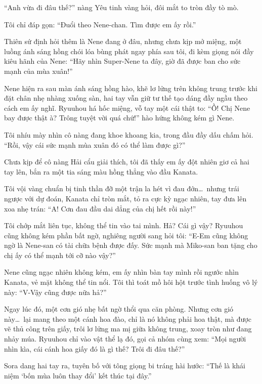 \documentclass[../main.tex]{subfiles}
\begin{document}
``Anh vừa đi đâu thế?'' nàng Yêu tinh vàng hỏi, đôi mắt to tròn đầy tò mò.

Tôi chỉ đáp gọn: ``Đuổi theo Nene-chan. Tìm được em ấy rồi.''

Thiên sứ định hỏi thêm là Nene đang ở đâu, nhưng chưa kịp mở miệng, một luồng ánh sáng hồng chói lóa bùng phát ngay phía sau tôi, đi kèm giọng nói đầy kiêu hãnh của Nene: ``Hãy nhìn Super-Nene ta đây, giờ đã được ban cho sức mạnh của mùa xuân!''

Nene hiện ra sau màn ánh sáng hồng hào, khẽ lơ lửng trên không trung trước khi đặt chân nhẹ nhàng xuống sàn, hai tay vẫn giữ tư thế tạo dáng đầy ngầu theo cách em ấy nghĩ. Ryuuhou há hốc miệng, vỗ tay một cái thật to: ``Ồ! Chị Nene bay được thật à? Trông tuyệt vời quá chứ!'' hào hứng không kém gì Nene.

Tôi nhíu mày nhìn cô nàng đang khoe khoang kia, trong đầu đầy dấu chấm hỏi. ``Rồi, vậy cái sức mạnh mùa xuân đó có thể làm được gì?''

Chưa kịp để cô nàng Hải cẩu giải thích, tôi đã thấy em ấy đột nhiên giơ cả hai tay lên, bắn ra một tia sáng màu hồng thẳng vào đầu Kanata.


Tôi vội vàng chuẩn bị tinh thần đỡ một trận la hét vì đau đớn\dots\ nhưng trái ngược với dự đoán, Kanata chỉ tròn mắt, tỏ ra cực kỳ ngạc nhiên, tay đưa lên xoa nhẹ trán: ``A! Cơn đau đầu dai dẳng của chị hết rồi này!''

Tôi chớp mắt liên tục, không thể tin vào tai mình. Hả? Cái gì vậy? Ryuuhou cũng không kém phần bất ngờ, nghiêng người sang hỏi tôi: ``E-Em cũng không ngờ là Nene-san có tài chữa bệnh được đấy. Sức mạnh mà Miko-san ban tặng cho chị ấy có thể mạnh tới cỡ nào vậy?''

Nene cũng ngạc nhiên không kém, em ấy nhìn bàn tay mình rồi ngước nhìn Kanata, vẻ mặt không thể tin nổi. Tôi thì toát mồ hôi hột trước tình huống vô lý này: ``V-Vậy cũng được nữa hả?''

Ngay lúc đó, một cơn gió nhẹ bất ngờ thổi qua căn phòng. Nhưng cơn gió này\dots\ lại mang theo một cánh hoa đào, chỉ là nó không phải hoa thật, mà được vẽ thủ công trên giấy, trôi lơ lửng ma mị giữa không trung, xoay tròn như đang nhảy múa. Ryuuhou chỉ vào vật thể lạ đó, gọi cả nhóm cùng xem: ``Mọi người nhìn kìa, cái cánh hoa giấy đó là gì thế? Trôi đi đâu thế?''

Sora dang hai tay ra, tuyên bố với tông giọng bi tráng hài hước: ``Thế là khái niệm `bốn mùa luôn thay đổi' kết thúc tại đây.''
\end{document}
